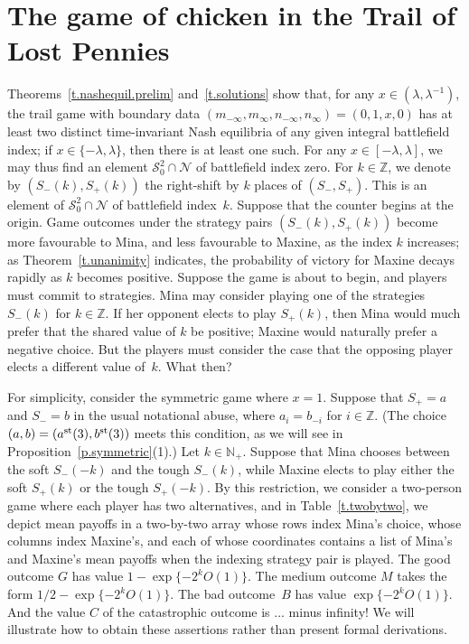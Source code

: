 \documentclass[letterpaper,11pt,oneside,reqno]{amsbook}
\newcommand{\N}{\ensuremath{\mathbb{N}}}
\newcommand{\Z}{\ensuremath{\mathbb{Z}}}
\numberwithin{figure}{chapter}
\theoremstyle{definition}
\theoremstyle{definition}
\theoremstyle{definition}
\theoremstyle{definition}
\theoremstyle{definition}
\newcommand{\mc}{\mathcal}
\newcommand{\nwithoutzero}{\N_+}
\newcommand{\asta}{a^{\rm st}}
\newcommand{\bst}{b^{\rm st}}
\begin{document}
\section{The game of chicken in the Trail of Lost Pennies}
Theorems~\ref{t.nashequil.prelim} and~\ref{t.solutions} show that, for any $x \in (\lambda,\lambda^{-1})$, the trail game with boundary data $(m_{-\infty},m_\infty,n_{-\infty},n_\infty) = (0,1,x,0)$ has at least two distinct time-invariant Nash equilibria of any given integral battlefield index; if $x \in \{- \lambda,\lambda\}$,
then there is at least one such. For any $x \in [-\lambda,\lambda]$, we may thus find an element $\mc{S}_0^2 \cap \mc{N}$ of battlefield index zero. For $k \in \Z$, we denote by 
$(S_-(k),S_+(k))$ the right-shift by $k$ places of $(S_-,S_+)$. This is an element of $\mc{S}_0^2 \cap \mc{N}$ of battlefield index~$k$. Suppose that the counter begins at the origin. 
Game outcomes under the strategy pairs $(S_-(k),S_+(k))$ become more favourable to Mina, and less favourable to Maxine, as the index $k$ increases; as Theorem~\ref{t.unanimity} indicates, the probability of victory for Maxine decays rapidly as $k$ becomes positive. Suppose the game is about to begin, and players must commit to strategies. Mina may consider playing one of the strategies $S_-(k)$ for $k \in \Z$. If her opponent elects to play $S_+(k)$, then Mina would much prefer that the shared value of $k$ be positive; Maxine would naturally prefer a negative choice. But the players must consider the case that the opposing player elects a different value of~$k$. What then?  

For simplicity, consider the symmetric game where $x=1$. Suppose that $S_+ = a$ and $S_-=b$ in the usual notational abuse, where $a_i = b_{-i}$ for $i \in \Z$.
(The choice $(a,b) = (\asta(3),\bst(3))$ meets this condition, as we will see in Proposition~\ref{p.symmetric}(1).)
Let $k \in \nwithoutzero$. Suppose that Mina chooses between  the soft $S_-(-k)$ and the tough  $S_-(k)$, while Maxine elects to play either  the soft $S_+(k)$ or the tough $S_+(-k)$. By this restriction, we consider a two-person game where each player has two alternatives, and in Table~\ref{t.twobytwo}, we depict mean payoffs in a two-by-two array whose rows index Mina's choice, whose columns index Maxine's, and each of whose coordinates contains a list of Mina's and Maxine's mean payoffs when the indexing strategy pair is played. The good outcome $G$ has value $1 - \exp \{- 2^k O(1) \}$.
The medium outcome $M$ takes the form $1/2 - \exp \{- 2^k O(1) \}$.
The bad outcome~$B$ has value  $\exp \{- 2^k O(1) \}$. And the value $C$ of the catastrophic outcome is ... minus infinity!
We will illustrate how to obtain these assertions rather than present formal derivations.
 
\end{document}
